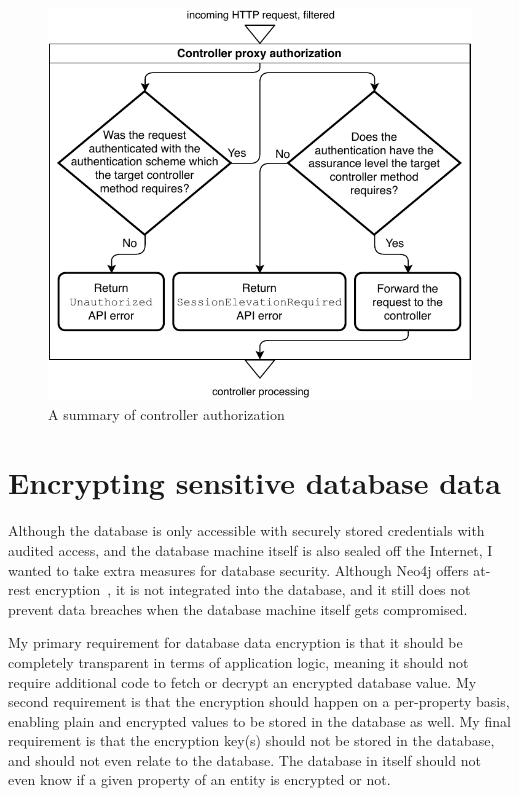 \begin{figure}[!htb]
    \centering
    \includegraphics[width=\textwidth-2cm]{figures/controller-authorization.pdf}
    \caption{A summary of controller authorization}
    \label{fig:controller-authorization}
\end{figure}

\section{Encrypting sensitive database data}

Although the database is only accessible with securely stored credentials with audited access, and the database machine itself is also sealed off the Internet, I wanted to take extra measures for database security. Although Neo4j offers at-rest encryption~\cite{neo4jatrestencryption}, it is not integrated into the database, and it still does not prevent data breaches when the database machine itself gets compromised.

My primary requirement for database data encryption is that it should be completely transparent in terms of application logic, meaning it should not require additional code to fetch or decrypt an encrypted database value. My second requirement is that the encryption should happen on a per-property basis, enabling plain and encrypted values to be stored in the database as well. My final requirement is that the encryption key(s) should not be stored in the database, and should not even relate to the database. The database in itself should not even know if a given property of an entity is encrypted or not.

